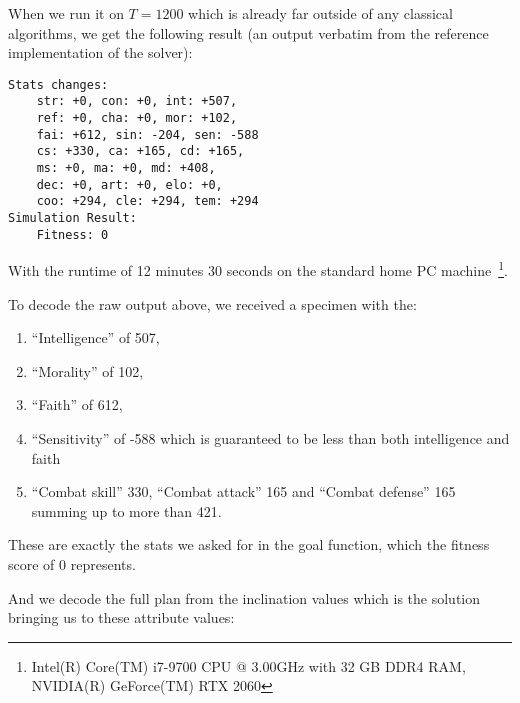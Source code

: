 \documentclass[12pt, a4paper]{report}
\begin{document}
	When we run it on $T=1200$ which is already far outside of any classical algorithms, we get the following result (an output verbatim from the reference implementation of the solver):
	
	\begin{verbatim}
Stats changes:
	str: +0, con: +0, int: +507,
	ref: +0, cha: +0, mor: +102,
	fai: +612, sin: -204, sen: -588
	cs: +330, ca: +165, cd: +165,
	ms: +0, ma: +0, md: +408,
	dec: +0, art: +0, elo: +0,
	coo: +294, cle: +294, tem: +294
Simulation Result:
	Fitness: 0
	\end{verbatim}

	With the runtime of 12 minutes 30 seconds on the standard home PC machine~\footnote{Intel(R) Core(TM) i7-9700 CPU @ 3.00GHz with 32 GB DDR4 RAM, NVIDIA(R) GeForce(TM) RTX 2060}.
	
	To decode the raw output above, we received a specimen with the:
	\begin{enumerate}
		\item ``Intelligence'' of 507,
		\item ``Morality'' of 102,
		\item ``Faith'' of 612,
		\item ``Sensitivity'' of -588 which is guaranteed to be less than both intelligence and faith
		\item ``Combat skill'' 330, ``Combat attack'' 165 and ``Combat defense'' 165 summing up to more than 421.
	\end{enumerate} 
	
	These are exactly the stats we asked for in the goal function, which the fitness score of 0 represents.
	
	And we decode the full plan from the inclination values which is the solution bringing us to these attribute values:
	
\end{document}
